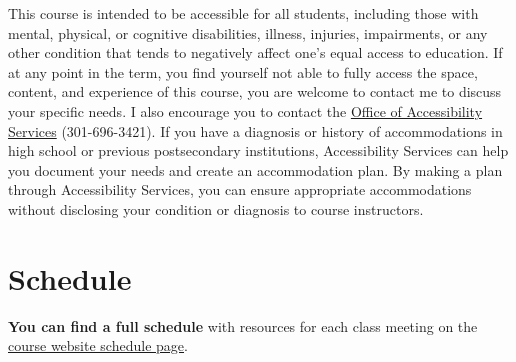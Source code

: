 \documentclass{article}
\begin{document}
This course is intended to be accessible for all students, including
those with mental, physical, or cognitive disabilities, illness,
injuries, impairments, or any other condition that tends to negatively
affect one's equal access to education. If at any point in the term, you
find yourself not able to fully access the space, content, and
experience of this course, you are welcome to contact me to discuss your
specific needs. I also encourage you to contact the
\href{https://www.hood.edu/academics/josephine-steiner-center-academic-achievement-retention/accessibility-services}{Office
of Accessibility Services} (301-696-3421). If you have a diagnosis or
history of accommodations in high school or previous postsecondary
institutions, Accessibility Services can help you document your needs
and create an accommodation plan. By making a plan through Accessibility
Services, you can ensure appropriate accommodations without disclosing
your condition or diagnosis to course instructors.

\hypertarget{schedule}{%
\section{Schedule}\label{schedule}}

\textbf{You can find a full schedule} with resources for each class
meeting on the
\href{http://metricsF19.classes.ryansafner.com/schedule/}{course website
schedule page}.
\end{document}
